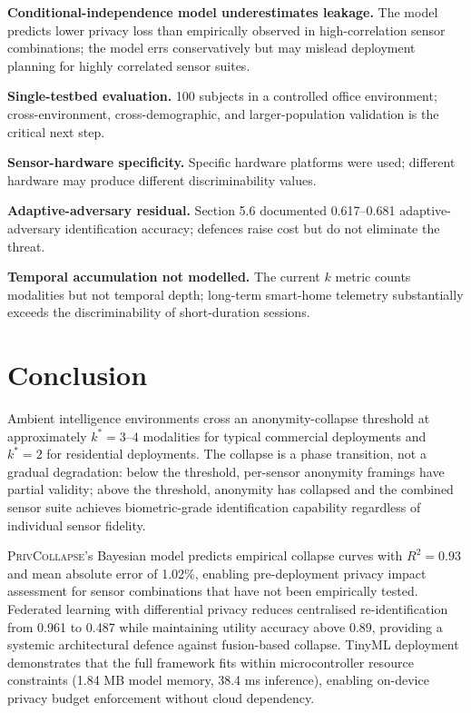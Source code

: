\documentclass[sigconf,nonacm]{acmart}
\begin{document}
\textbf{Conditional-independence model underestimates leakage.}
The model predicts lower privacy loss than empirically observed
in high-correlation sensor combinations; the model errs
conservatively but may mislead deployment planning for highly
correlated sensor suites.

\textbf{Single-testbed evaluation.} 100 subjects in a controlled
office environment; cross-environment, cross-demographic, and
larger-population validation is the critical next step.

\textbf{Sensor-hardware specificity.} Specific hardware platforms
were used; different hardware may produce different
discriminability values.

\textbf{Adaptive-adversary residual.} Section 5.6 documented
0.617--0.681 adaptive-adversary identification accuracy; defences
raise cost but do not eliminate the threat.

\textbf{Temporal accumulation not modelled.} The current $k$
metric counts modalities but not temporal depth; long-term
smart-home telemetry substantially exceeds the discriminability
of short-duration sessions.

\section{Conclusion}

Ambient intelligence environments cross an anonymity-collapse
threshold at approximately $k^* = 3$--$4$ modalities for typical
commercial deployments and $k^* = 2$ for residential
deployments. The collapse is a phase transition, not a gradual
degradation: below the threshold, per-sensor anonymity
framings have partial validity; above the threshold, anonymity
has collapsed and the combined sensor suite achieves
biometric-grade identification capability regardless of
individual sensor fidelity.

\textsc{PrivCollapse}'s Bayesian model predicts empirical
collapse curves with $R^2 = 0.93$ and mean absolute error of
1.02\%, enabling pre-deployment privacy impact assessment for
sensor combinations that have not been empirically tested.
Federated learning with differential privacy reduces centralised
re-identification from 0.961 to 0.487 while maintaining utility
accuracy above 0.89, providing a systemic architectural defence
against fusion-based collapse. TinyML deployment demonstrates
that the full framework fits within microcontroller resource
constraints (1.84 MB model memory, 38.4 ms inference), enabling
on-device privacy budget enforcement without cloud dependency.
\end{document}
